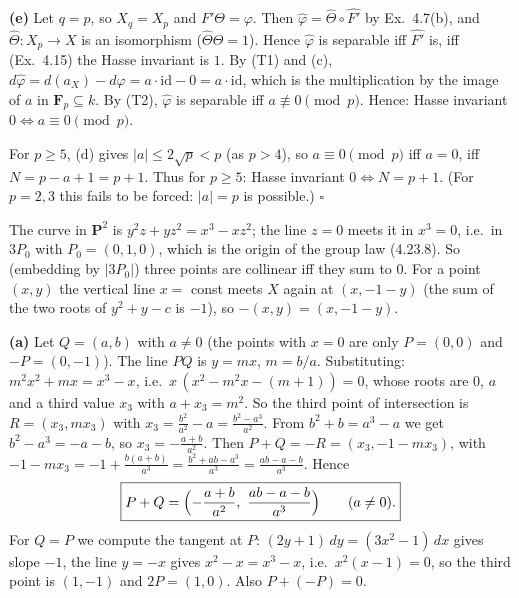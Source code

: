 \documentclass[11pt]{article}
\begin{document}
\textbf{(e)} Let $q=p$, so $X_q=X_p$ and $F'\Theta=\varphi$. Then $\widehat\varphi=\widehat\Theta\circ\widehat{F'}$ by Ex.~4.7(b), and $\widehat\Theta:X_p\to X$ is an isomorphism ($\widehat\Theta\Theta=1$). Hence $\widehat\varphi$ is separable iff $\widehat{F'}$ is, iff (Ex.~4.15) the Hasse invariant is $1$. By (T1) and (c), $d\widehat\varphi=d(a_X)-d\varphi=a\cdot\mathrm{id}-0=a\cdot\mathrm{id}$, which is the multiplication by the image of $a$ in $\mathbf F_p\subseteq k$. By (T2), $\widehat\varphi$ is separable iff $a\not\equiv0\pmod p$. Hence: Hasse invariant $0\iff a\equiv0\pmod p$.

For $p\ge5$, (d) gives $|a|\le2\sqrt p<p$ (as $p>4$), so $a\equiv0\pmod p$ iff $a=0$, iff $N=p-a+1=p+1$. Thus for $p\ge5$: Hasse invariant $0\iff N=p+1$. (For $p=2,3$ this fails to be forced: $|a|=p$ is possible.) \hfill$\square$

\pf
The curve in $\mathbf P^2$ is $y^2z+yz^2=x^3-xz^2$; the line $z=0$ meets it in $x^3=0$, i.e.\ in $3P_0$ with $P_0=(0,1,0)$, which is the origin of the group law (4.23.8). So (embedding by $|3P_0|$) three points are collinear iff they sum to $0$. For a point $(x,y)$ the vertical line $x=$ const meets $X$ again at $(x,-1-y)$ (the sum of the two roots of $y^2+y-c$ is $-1$), so $-(x,y)=(x,-1-y)$.

\textbf{(a)} Let $Q=(a,b)$ with $a\neq0$ (the points with $x=0$ are only $P=(0,0)$ and $-P=(0,-1)$). The line $PQ$ is $y=mx$, $m=b/a$. Substituting: $m^2x^2+mx=x^3-x$, i.e.\ $x\,(x^2-m^2x-(m+1))=0$, whose roots are $0$, $a$ and a third value $x_3$ with $a+x_3=m^2$. So the third point of intersection is $R=(x_3,mx_3)$ with $x_3=\frac{b^2}{a^2}-a=\frac{b^2-a^3}{a^2}$. From $b^2+b=a^3-a$ we get $b^2-a^3=-a-b$, so $x_3=-\frac{a+b}{a^2}$. Then $P+Q=-R=(x_3,-1-mx_3)$, with $-1-mx_3=-1+\frac{b(a+b)}{a^3}=\frac{b^2+ab-a^3}{a^3}=\frac{ab-a-b}{a^3}$. Hence
\[
\boxed{P+Q=\Bigl(-\frac{a+b}{a^2},\ \frac{ab-a-b}{a^3}\Bigr)\qquad(a\ne0).}
\]
For $Q=P$ we compute the tangent at $P$: $(2y+1)\,dy=(3x^2-1)\,dx$ gives slope $-1$, the line $y=-x$ gives $x^2-x=x^3-x$, i.e.\ $x^2(x-1)=0$, so the third point is $(1,-1)$ and $2P=(1,0)$. Also $P+(-P)=0$.
\end{document}
